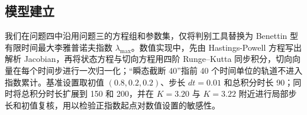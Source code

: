 \subsection{模型建立}
我们在问题四中沿用问题三的方程组和参数集，仅将判别工具替换为 Benettin 型有限时间最大李雅普诺夫指数 $\lambda_{\max}$。数值实现中，先由 Hastings-Powell 方程写出解析 Jacobian，再将状态方程与切向方程用四阶 Runge--Kutta 同步积分，切向向量在每个时间步进行一次归一化；“瞬态截断 40”指前 40 个时间单位的轨道不进入指数累计。基准设置取初值 $(0.8,0.2,0.2)$、步长 $dt=0.01$ 和总积分时长 90；同时将总积分时长扩展到 150 和 200，并在 $K=3.20$ 与 $K=3.22$ 附近进行局部步长和初值复核，用以检验正指数起点对数值设置的敏感性。

